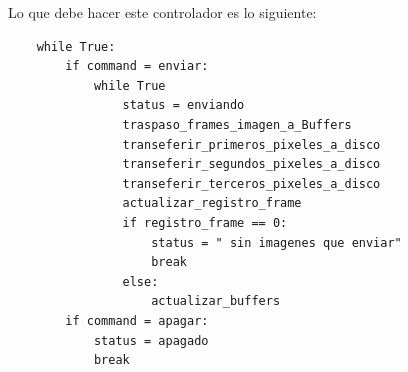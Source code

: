 \documentclass{article}
\begin{document}
Lo que debe hacer este controlador es lo siguiente:
 \begin{lstlisting} 
    while True:
        if command = enviar:
            while True
                status = enviando
                traspaso_frames_imagen_a_Buffers
                transeferir_primeros_pixeles_a_disco
                transeferir_segundos_pixeles_a_disco
                transeferir_terceros_pixeles_a_disco
                actualizar_registro_frame
                if registro_frame == 0:
                    status = " sin imagenes que enviar"
                    break
                else:
                    actualizar_buffers
        if command = apagar:
            status = apagado
            break
    \end{lstlisting}
                
        
        

\end{document}
